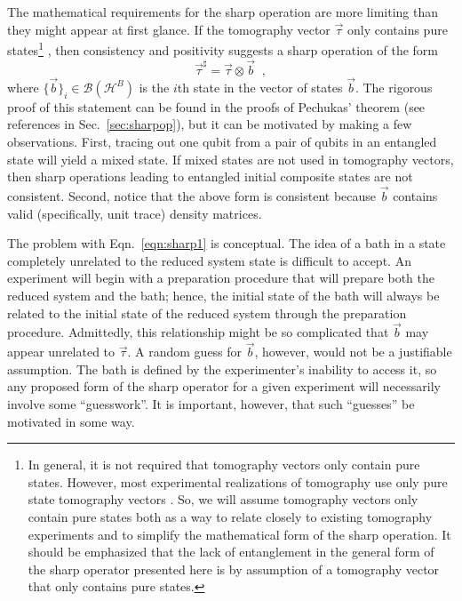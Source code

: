 The mathematical requirements for the sharp operation are more limiting than they might appear at first glance.  If the tomography vector $\vec{\tau}$ only contains pure states\footnote{In general, it is not required that tomography vectors only contain pure states.  However, most experimental realizations of tomography use only pure state tomography vectors \cite{Paris2004, Nielsen2010}.  So, we will assume tomography vectors only contain pure states both as a way to relate closely to existing tomography experiments and to simplify the mathematical form of the sharp operation.  It should be emphasized that the lack of entanglement in the general form of the sharp operator presented here is by assumption of a tomography vector that only contains pure states.} , then consistency and positivity suggests a sharp operation of the form
\begin{equation}
\label{eqn:sharp1}
\vec{\tau}^\sharp = \vec{\tau}\otimes \vec{b}\;\;,
\end{equation}
where $\{\vec{b}\}_i\in\mathcal{B}(\mathcal{H}^B)$ is the $i$th state in the vector of states $\vec{b}$.  The rigorous proof of this statement can be found in the proofs of Pechukas' theorem (see references in Sec.\ \ref{sec:sharpop}), but it can be motivated by making a few observations.  First, tracing out one qubit from a pair of qubits in an entangled state will yield a mixed state.  If mixed states are not used in tomography vectors, then sharp operations leading to entangled initial composite states are not consistent.  Second, notice that the above form is consistent because $\vec{b}$ contains valid (specifically, unit trace) density matrices. 

The problem with Eqn.\ \ref{eqn:sharp1} is conceptual.  The idea of a bath in a state completely unrelated to the reduced system state is difficult to accept.  An experiment will begin with a preparation procedure that will prepare both the reduced system and the bath; hence, the initial state of the bath will always be related to the initial state of the reduced system through the preparation procedure.  Admittedly, this relationship might be so complicated that $\vec{b}$ may appear unrelated to $\vec{\tau}$.  A random guess for $\vec{b}$, however, would not be a justifiable assumption.  The bath is defined by the experimenter's inability to access it, so any proposed form of the sharp operator for a given experiment will necessarily involve some ``guesswork''.  It is important, however, that such ``guesses'' be motivated in some way.  

